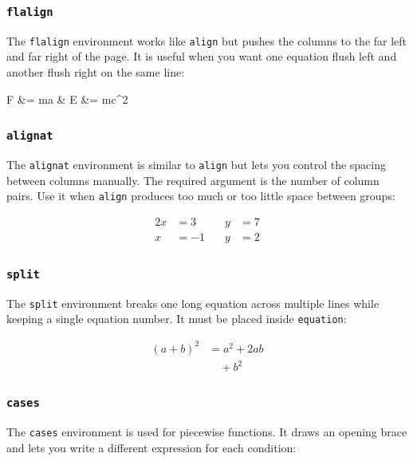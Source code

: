 		\subsubsection{\texttt{flalign}}
		The \texttt{flalign} environment works like \texttt{align} but pushes the columns to the far left and far right of the page. It is useful when you want one equation flush left and another flush right on the same line:
		
		\begin{flalign}
			F &= ma & E &= mc^2
		\end{flalign}
		
		\subsubsection{\texttt{alignat}}
		The \texttt{alignat} environment is similar to \texttt{align} but lets you control the spacing between columns manually. The required argument is the number of column pairs. Use it when \texttt{align} produces too much or too little space between groups:
		
		\begin{alignat}{2}
			x &= 3  &\quad y &= 7 \\
			x &= -1 &\quad y &= 2
		\end{alignat}
		
		\subsubsection{\texttt{split}}
		The \texttt{split} environment breaks one long equation across multiple lines while keeping a single equation number. It must be placed inside \texttt{equation}:
		
		\begin{equation}
			\begin{split}
				(a + b)^2 &= a^2 + 2ab \\
				&\quad + b^2
			\end{split}
		\end{equation}
		
		\subsubsection{\texttt{cases}}
		The \texttt{cases} environment is used for piecewise functions. It draws an opening brace and lets you write a different expression for each condition:
		
